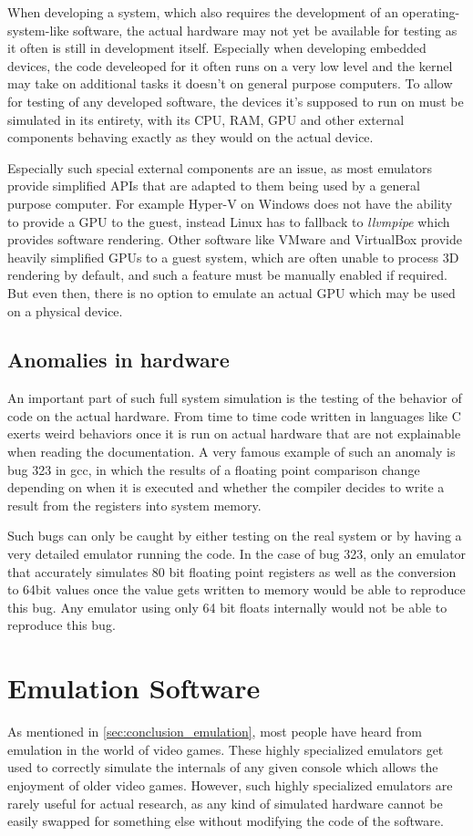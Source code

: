 When developing a system, which also requires the development of an operating-system-like
software, the actual hardware may not yet be available for testing
as it often is still in development itself.
Especially when developing embedded devices,
the code develeoped for it often runs on a very low level
and the kernel may take on additional tasks it doesn't on general purpose computers.
To allow for testing of any developed software,
the devices it's supposed to run on must be simulated in its entirety,
with its CPU, RAM, GPU and other external components behaving exactly as they would on the actual device.

Especially such special external components are an issue,
as most emulators provide simplified APIs that are adapted to them being used by a general purpose computer.
For example Hyper-V on Windows does not have the ability to provide a GPU to the guest,
instead Linux has to fallback to \emph{llvmpipe} which provides software rendering.
Other software like VMware and VirtualBox provide heavily simplified GPUs to a guest system,
which are often unable to process 3D rendering by default,
and such a feature must be manually enabled if required.
But even then, there is no option to emulate an actual GPU which may be used on a physical device.

\subsection{Anomalies in hardware}
An important part of such full system simulation is the testing of the behavior of code on the actual hardware.
From time to time code written in languages like C exerts weird behaviors once it is run on actual hardware
that are not explainable when reading the documentation.
A very famous example of such an anomaly is bug 323\cite{323} in gcc,
in which the results of a floating point comparison change depending on when it is executed
and whether the compiler decides to write a result from the registers into system memory.

Such bugs can only be caught by either testing on the real system
or by having a very detailed emulator running the code.
In the case of bug 323, only an emulator that accurately simulates 80 bit floating point registers
as well as the conversion to 64bit values once the value gets written to memory
would be able to reproduce this bug.
Any emulator using only 64 bit floats internally would not be able to reproduce this bug.

\section{Emulation Software}
As mentioned in \autoref{sec:conclusion_emulation}, most people have heard from emulation in the world of video games.
These highly specialized emulators get used to correctly simulate the internals of any given console
which allows the enjoyment of older video games.
However, such highly specialized emulators are rarely useful for actual research,
as any kind of simulated hardware cannot be easily swapped for something else without modifying the code of the software.

